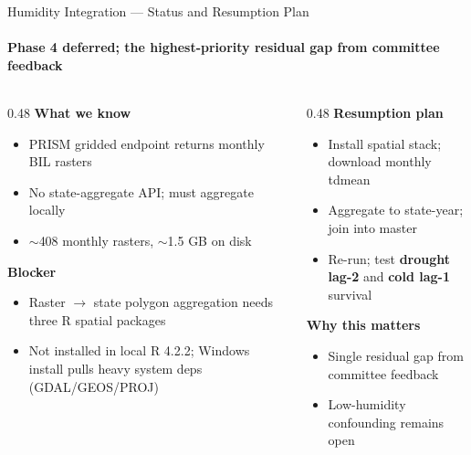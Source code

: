 \documentclass[aspectratio=169,11pt]{beamer}
\newcommand{\emphcolor}[1]{{\color{WarmOrange}\textbf{#1}}}
\newcommand{\tealtext}[1]{{\color{Teal}#1}}
\begin{document}
\begin{frame}{Humidity Integration --- Status and Resumption Plan}
  \framesubtitle{Phase 4 deferred; the highest-priority residual gap from committee feedback}
  \begin{columns}[T]
    \begin{column}{0.48\textwidth}
      \textbf{\tealtext{What we know}}
      \begin{itemize}\itemsep0.15em
        \item PRISM gridded endpoint returns monthly BIL rasters
        \item No state-aggregate API; must aggregate locally
        \item \(\sim\)408 monthly rasters, \(\sim\)1.5 GB on disk
      \end{itemize}
      \vspace{0.4em}
      \textbf{\tealtext{Blocker}}
      \begin{itemize}\itemsep0.15em
        \item Raster \(\to\) state polygon aggregation needs three R spatial packages
        \item Not installed in local R 4.2.2; Windows install pulls heavy system deps (GDAL/GEOS/PROJ)
      \end{itemize}
    \end{column}
    \begin{column}{0.48\textwidth}
      \textbf{\tealtext{Resumption plan}}
      \begin{itemize}\itemsep0.10em
        \item Install spatial stack; download monthly tdmean
        \item Aggregate to state-year; join into master
        \item Re-run; test \emphcolor{drought lag-2} and \emphcolor{cold lag-1} survival
      \end{itemize}
      \vspace{0.2em}
      \textbf{\tealtext{Why this matters}}
      \begin{itemize}\itemsep0.10em
        \item Single residual gap from committee feedback
        \item Low-humidity confounding remains open
      \end{itemize}
    \end{column}
  \end{columns}
\end{frame}
\end{document}
